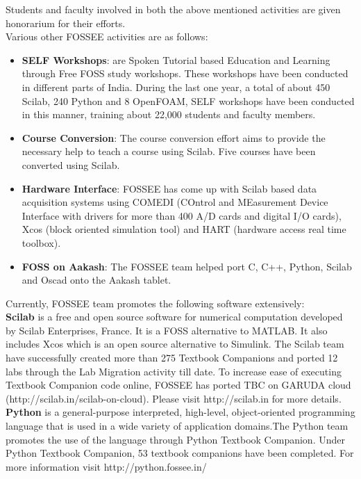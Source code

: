 \documentclass[9pt]{article}
\begin{document}
Students and faculty involved in both the above mentioned activities
are given honorarium for their efforts. \\

Various other FOSSEE activities are as follows:

\begin{itemize}
\item{{\bf{SELF Workshops}}: are Spoken Tutorial based Education and Learning
through Free FOSS study workshops. These workshops have been conducted
in different parts of India. During the last one year, a total of
about 450 Scilab, 240 Python and 8 OpenFOAM, SELF workshops have been
conducted in this manner, training about 22,000 students and faculty
members.}
\item{{\bf{Course Conversion}}: The course conversion effort aims to provide
the necessary help to teach a course using Scilab. Five courses have
been converted using Scilab.}
\item{{\bf{Hardware Interface}}: FOSSEE has come up with Scilab based data
acquisition systems using COMEDI (COntrol and MEasurement Device
Interface with drivers for more than 400 A/D cards and digital I/O
cards), Xcos (block oriented simulation tool) and HART (hardware
access real time toolbox).}
\item{{\bf{FOSS on Aakash}}: The FOSSEE team helped port C, C++, Python,
Scilab and Oscad onto the Aakash tablet.}
\end{itemize} 

Currently, FOSSEE team promotes the following software extensively: \\

{\bf{Scilab}} is a free and open source software for numerical
computation developed by Scilab Enterprises, France. It is a FOSS
alternative to MATLAB.  It also includes Xcos which is an open source
alternative to Simulink. The Scilab team have successfully created
more than 275 Textbook Companions and ported 12 labs through the Lab
Migration activity till date. To increase ease of executing Textbook
Companion code online, FOSSEE has ported TBC on GARUDA cloud
(http://scilab.in/scilab-on-cloud). Please visit http://scilab.in for
more details. \\

{\bf{Python}} is a general-purpose interpreted, high-level,
object-oriented programming language that is used in a wide variety of
application domains.The Python team promotes the use of the language
through Python Textbook Companion. Under Python Textbook Companion, 53
textbook companions have been completed. For more information visit
http://python.fossee.in/ \\
\end{document}
